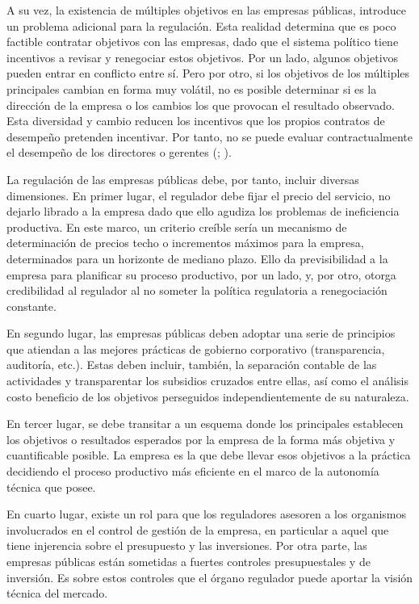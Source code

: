 \documentclass[
  12pt,
  spanish,
]{book}
\begin{document}
A su vez, la existencia de múltiples objetivos en las empresas públicas,
introduce un problema adicional para la regulación. Esta realidad
determina que es poco factible contratar objetivos con las empresas,
dado que el sistema político tiene incentivos a revisar y renegociar
estos objetivos. Por un lado, algunos objetivos pueden entrar en
conflicto entre sí. Pero por otro, si los objetivos de los múltiples
principales cambian en forma muy volátil, no es posible determinar si es
la dirección de la empresa o los cambios los que provocan el resultado
observado. Esta diversidad y cambio reducen los incentivos que los
propios contratos de desempeño pretenden incentivar. Por tanto, no se
puede evaluar contractualmente el desempeño de los directores o gerentes
(\citet{Martimort1996}; \citet{Dixit1997}).

La regulación de las empresas públicas debe, por tanto, incluir diversas
dimensiones. En primer lugar, el regulador debe fijar el precio del
servicio, no dejarlo librado a la empresa dado que ello agudiza los
problemas de ineficiencia productiva. En este marco, un criterio creíble
sería un mecanismo de determinación de precios techo o incrementos
máximos para la empresa, determinados para un horizonte de mediano
plazo. Ello da previsibilidad a la empresa para planificar su proceso
productivo, por un lado, y, por otro, otorga credibilidad al regulador
al no someter la política regulatoria a renegociación constante.

En segundo lugar, las empresas públicas deben adoptar una serie de
principios que atiendan a las mejores prácticas de gobierno corporativo
(transparencia, auditoría, etc.). Estas deben incluir, también, la
separación contable de las actividades y transparentar los subsidios
cruzados entre ellas, así como el análisis costo beneficio de los
objetivos perseguidos independientemente de su naturaleza.

En tercer lugar, se debe transitar a un esquema donde los principales
establecen los objetivos o resultados esperados por la empresa de la
forma más objetiva y cuantificable posible. La empresa es la que debe
llevar esos objetivos a la práctica decidiendo el proceso productivo más
eficiente en el marco de la autonomía técnica que posee.

En cuarto lugar, existe un rol para que los reguladores asesoren a los
organismos involucrados en el control de gestión de la empresa, en
particular a aquel que tiene injerencia sobre el presupuesto y las
inversiones. Por otra parte, las empresas públicas están sometidas a
fuertes controles presupuestales y de inversión. Es sobre estos
controles que el órgano regulador puede aportar la visión técnica del
mercado.
\end{document}
